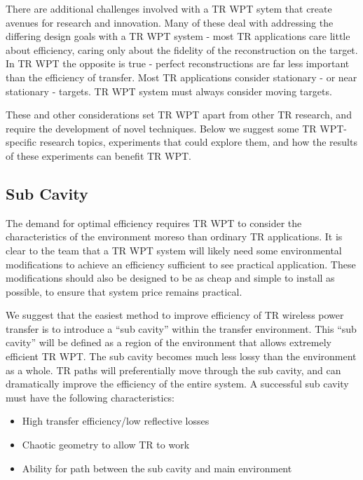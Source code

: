 There are additional challenges involved with a TR WPT sytem that create avenues for research and innovation. Many of these deal with addressing the differing design goals with a TR WPT system - most TR applications care little about efficiency, caring only about the fidelity of the reconstruction on the target. In TR WPT the opposite is true - perfect reconstructions are far less important than the efficiency of transfer. Most TR applications consider stationary - or near stationary - targets. TR WPT system must always consider moving targets.

These and other considerations set TR WPT apart from other TR research, and require the development of novel techniques. Below we suggest some TR WPT-specific research topics, experiments that could explore them, and how the results of these experiments can benefit TR WPT.

\subsection{Sub Cavity}

The demand for optimal efficiency requires TR WPT to consider the characteristics of the environment moreso than ordinary TR applications. It is clear to the team that a TR WPT system will likely need some environmental modifications to achieve an efficiency sufficient to see practical application. These modifications should also be designed to be as cheap and simple to install as possible, to ensure that system price remains practical.

We suggest that the easiest method to improve efficiency of TR wireless power transfer is to introduce a ``sub cavity'' within the transfer environment. This ``sub cavity'' will be defined as a region of the environment that allows extremely efficient TR WPT. The sub cavity becomes much less lossy than the environment as a whole. TR paths will preferentially move through the sub cavity, and can dramatically improve the efficiency of the entire system. A successful sub cavity must have the following characteristics:

\begin{itemize}
  \item High transfer efficiency/low reflective losses
  \item Chaotic geometry to allow TR to work
  \item Ability for path between the sub cavity and main environment
\end{itemize}

